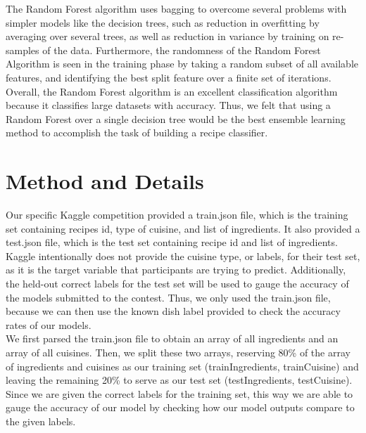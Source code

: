 \documentclass[11pt]{article}
\begin{document}
The Random Forest algorithm uses bagging to overcome several problems with simpler models
like the decision trees, such as reduction in overfitting by averaging over several trees, as well
as reduction in variance by training on re-samples of the data. Furthermore,
the randomness of the Random Forest Algorithm is seen in the training phase by taking a random subset
of all available features, and identifying the best split feature over a finite set
of iterations. Overall, the Random Forest algorithm is an excellent classification
algorithm because it classifies large datasets with accuracy.
Thus, we felt that using a Random Forest over a single decision tree would be
the best ensemble learning method to accomplish the task of building a
recipe classifier. \\

\section{Method and Details}

Our specific Kaggle competition provided a train.json file, which is the training
set containing recipes id, type of cuisine, and list of ingredients. It also
provided a test.json file, which is the test set containing recipe id and list of
ingredients. Kaggle intentionally does not provide the cuisine type, or labels, for
their test set, as it is the target variable that participants are trying to predict.
Additionally, the held-out correct labels for the test set will be used to gauge
the accuracy of the models submitted to the contest. Thus, we only used the
train.json file, because we can then use the known dish label provided to check
the accuracy rates of our models. \\

We first parsed the train.json file to obtain an array of all ingredients and an
array of all cuisines. Then, we split these two arrays, reserving 80\% of the array
of ingredients and cuisines as our training set (trainIngredients, trainCuisine) and
leaving the remaining 20\% to serve as our test set (testIngredients, testCuisine).
Since we are given the correct labels for the training set, this way we are able
to gauge the accuracy of our model by checking how our model outputs
compare to the given labels. \\
\end{document}
